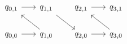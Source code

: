 
\[
  \begin{tikzcd}[row sep=1.7em, column sep=1.7em]
    q_{0,1} \arrow[r]  & q_{1,1} \arrow[dr] & q_{2,1} \arrow[r] & q_{3,1} \\
    q_{0,0} \arrow[r]  & q_{1,0} \arrow[ul] & q_{2,0} \arrow[r] & q_{3,0} \arrow[ul]
  \end{tikzcd}
\]